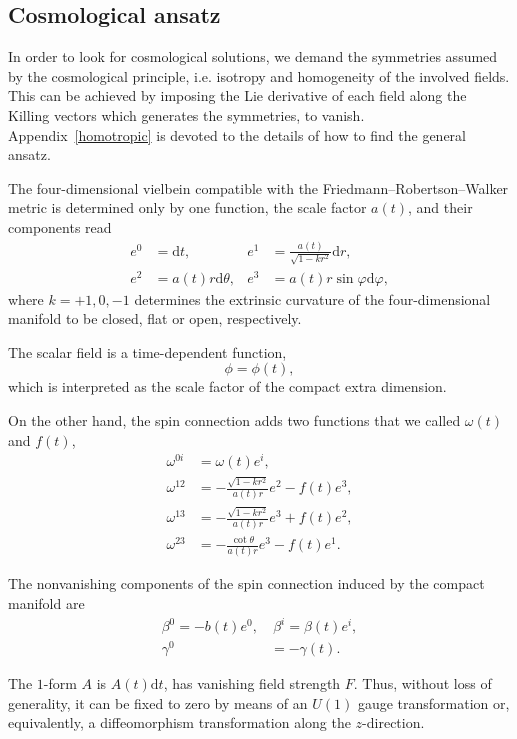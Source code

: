 \documentclass[aps,prd,12pt,superscriptaddress,showpacs,showkeys,longbibliography,reprint,nofootinbib]{revtex4-1}
\begin{document}
\subsection{Cosmological ansatz}

In order to look for cosmological solutions, we demand the symmetries assumed by the cosmological principle, i.e. isotropy and homogeneity of the involved fields. This can be achieved by imposing the Lie derivative of each field along the Killing vectors which generates the symmetries, to vanish. Appendix~\ref{homotropic} is devoted to the details of how to find the general ansatz.

The four-dimensional vielbein compatible with the Friedmann--Robertson--Walker metric is determined only by one function, the scale factor $a(t)$, and their components read
\begin{align}
  \label{vielbein cosmo}
  e^0&=\mbox{d}t, & e^1&=\frac{a(t)}{\sqrt{1-kr^2}}\mbox{d}r,\\
  e^2&=a(t)r\mbox{d}\theta, & e^3&=a(t)r\sin\varphi\mbox{d}\varphi, 
\end{align}
where $k=+1,0,-1$ determines the extrinsic curvature of the four-dimensional manifold to be closed, flat or open, respectively. 

The scalar field is a time-dependent function, 
\begin{equation}
  \phi=\phi(t),
\end{equation}
which is interpreted as the scale factor of the compact extra dimension.

On the other hand, the spin connection adds two functions that we called $\omega(t)$ and $f(t)$,
\begin{align}
  \omega^{0i}&=\omega(t) e^i,\\
  \omega^{12}&=-\frac{\sqrt{1-kr^2}}{a(t)r}e^2-f(t)e^3,\\
  \omega^{13}&=-\frac{\sqrt{1-kr^2}}{a(t)r}e^3+f(t)e^2,\\
  \omega^{23}&=-\frac{\cot\theta}{a(t)r}e^3-f(t)e^1.
\end{align}

The nonvanishing components of the spin connection induced by the compact manifold are
\begin{align}
  \beta^0=-b(t)e^0,&\ \beta^i=\beta(t)e^i,\\
  \label{gamma cosmo}
  \gamma^0&=-\gamma(t).
\end{align}

The $1$-form $A$ is $A(t)\text{d}t$, has vanishing field strength $F$. Thus, without loss of generality, it can be fixed to zero by means of an $U(1)$ gauge transformation or, equivalently, a diffeomorphism transformation along the $z$-direction.
\end{document}
